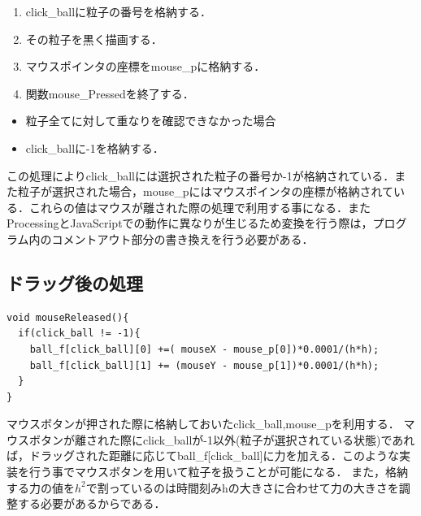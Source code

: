 \begin{enumerate}
 \setlength{\leftskip}{1.0cm}
  \item click\_ballに粒子の番号を格納する．
  \item その粒子を黒く描画する．
  \item マウスポインタの座標をmouse\_pに格納する．
  \item 関数mouse\_Pressedを終了する．
\end{enumerate}

\begin{itemize}
  \item 粒子全てに対して重なりを確認できなかった場合
\end{itemize}

\begin{itemize}
   \setlength{\leftskip}{1.0cm}
  \item click\_ballに-1を格納する．
\end{itemize}
この処理によりclick\_ballには選択された粒子の番号か-1が格納されている．また粒子が選択された場合，mouse\_pにはマウスポインタの座標が格納されている．これらの値はマウスが離された際の処理で利用する事になる．またProcessingとJavaScriptでの動作に異なりが生じるため変換を行う際は，プログラム内のコメントアウト部分の書き換えを行う必要がある．

\subsection{ドラッグ後の処理}
\begin{screen}
{\small
\begin{verbatim}
void mouseReleased(){
  if(click_ball != -1){
    ball_f[click_ball][0] +=( mouseX - mouse_p[0])*0.0001/(h*h);
    ball_f[click_ball][1] += (mouseY - mouse_p[1])*0.0001/(h*h);
  }
}
\end{verbatim}}
\end{screen}
マウスボタンが押された際に格納しておいたclick\_ball,mouse\_pを利用する．
マウスボタンが離された際にclick\_ballが-1以外(粒子が選択されている状態)であれば，ドラッグされた距離に応じてball\_f[click\_ball]に力を加える．このような実装を行う事でマウスボタンを用いて粒子を扱うことが可能になる．
また，格納する力の値を$h^2$で割っているのは時間刻みhの大きさに合わせて力の大きさを調整する必要があるからである．

